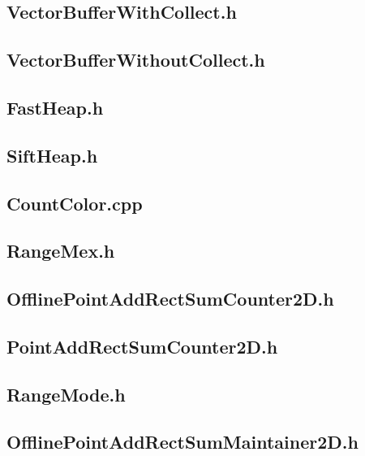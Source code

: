 \subsection{VectorBufferWithCollect.h}

\subsection{VectorBufferWithoutCollect.h}

\subsection{FastHeap.h}

\subsection{SiftHeap.h}

\subsection{CountColor.cpp}

\subsection{RangeMex.h}

\subsection{OfflinePointAddRectSumCounter2D.h}

\subsection{PointAddRectSumCounter2D.h}

\subsection{RangeMode.h}

\subsection{OfflinePointAddRectSumMaintainer2D.h}

